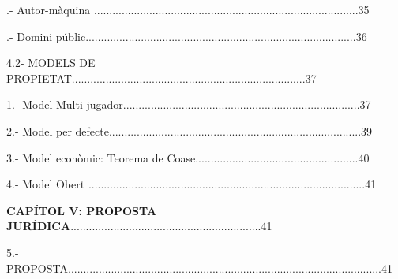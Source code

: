 \documentclass[12pt]{article}
\begin{document}
\begin{justify}
.- Autor-màquina ......................................................................................35
\end{justify}\par

\begin{justify}
.- Domini públic........................................................................................36
\end{justify}\par


\vspace{\baselineskip}
\begin{justify}
4.2- MODELS DE PROPIETAT............................................................................37
\end{justify}\par


\vspace{\baselineskip}
1.- Model Multi-jugador.............................................................................37\par


\vspace{\baselineskip}
2.- Model per defecte..................................................................................39\par


\vspace{\baselineskip}
3.- Model econòmic: Teorema de Coase.....................................................40\par


\vspace{\baselineskip}
4.- Model Obert ..........................................................................................41\par


\vspace{\baselineskip}
\begin{justify}
\textbf{CAPÍTOL V: PROPOSTA JURÍDICA}..............................................................41
\end{justify}\par


\vspace{\baselineskip}
\begin{justify}
5.- PROPOSTA......................................................................................................41
\end{justify}\par
\end{document}
